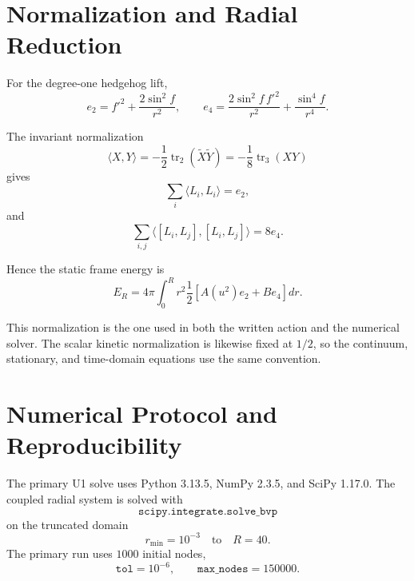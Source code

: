 \documentclass[11pt]{article}
\begin{document}
\section{Normalization and Radial Reduction}

\label{app:normalization}

For the degree-one hedgehog lift,
\begin{equation}
e_2
=
f'^2+\frac{2\sin^2f}{r^2},
\qquad
e_4
=
\frac{2\sin^2f\,f'^2}{r^2}
+
\frac{\sin^4f}{r^4}.
\end{equation}

The invariant normalization
\begin{equation}
\langle X,Y\rangle
=
-\frac12\operatorname{tr}_2(\widetilde X\widetilde Y)
=
-\frac18\operatorname{tr}_3(XY)
\end{equation}
gives
\begin{equation}
\sum_i\langle L_i,L_i\rangle=e_2,
\end{equation}
and
\begin{equation}
\sum_{i,j}
\langle[L_i,L_j],[L_i,L_j]\rangle
=
8e_4.
\end{equation}

Hence the static frame energy is
\begin{equation}
E_R
=
4\pi
\int_0^R
r^2
\frac12
\left[
A(u^2)e_2+B e_4
\right]dr.
\end{equation}

This normalization is the one used in both the written action and the numerical solver. The scalar kinetic normalization is likewise fixed at \(1/2\), so the continuum, stationary, and time-domain equations use the same convention.

\section{Numerical Protocol and Reproducibility}

\label{app:numerics}

The primary U1 solve uses Python 3.13.5, NumPy 2.3.5, and SciPy 1.17.0. The coupled radial system is solved with
\begin{equation}
\texttt{scipy.integrate.solve\_bvp}
\end{equation}
on the truncated domain
\begin{equation}
r_{\min}=10^{-3}
\quad\text{to}\quad
R=40.
\end{equation}
The primary run uses \(1000\) initial nodes,
\begin{equation}
\texttt{tol}=10^{-6},
\qquad
\texttt{max\_nodes}=150000.
\end{equation}
\end{document}
